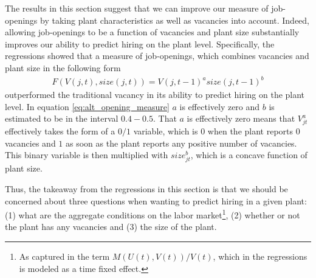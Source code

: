 The results in this section suggest that we can improve our measure of job-openings by taking plant characteristics as well as vacancies into account. Indeed, allowing job-openings to be a function of vacancies and plant size substantially improves our ability to predict hiring on the plant level. Specifically, the regressions showed that a measure of job-openings, which combines vacancies and plant size in the following form
\begin{align}
F(V(j,t), size(j,t))=V(j,t-1)^{a} size(j,t-1)^{b}
\label{eq:alt_opening_measure}
\end{align}
outperformed the traditional vacancy in its ability to predict hiring on the plant level. In equation \eqref{eq:alt_opening_measure}
$a$ is effectively zero and $b$ is estimated to be in the interval $0.4-0.5$. That $a$ is effectively zero means that $V_{jt}^{a}$ effectively takes the form of a $0/1$ variable, which is $0$ when the plant reports $0$ vacancies and $1$ as soon as the plant reports any positive number of vacancies. This binary variable is then multiplied with $size_{jt}^{b}$, which is a concave function of plant size. 

Thus, the takeaway from the regressions in this section is that we should be concerned about three questions when wanting to predict hiring in a given plant: (1) what are the aggregate conditions on the labor market\footnote{As captured in the term $M(U(t),V(t))/V(t)$, which in the regressions is modeled as a time fixed effect.}, (2) whether or not the plant has any vacancies and (3) the size of the plant.

